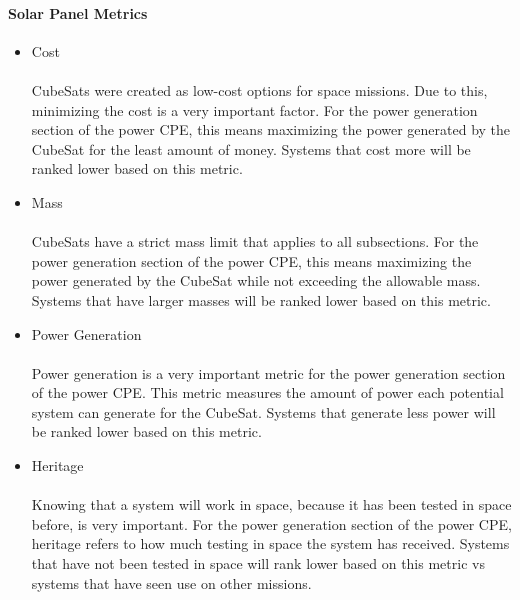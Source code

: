 \documentclass[3p]{elsarticle}
\begin{document}
\paragraph{Solar Panel Metrics}
\begin{itemize}
\item Cost\\
\\
CubeSats were created as low-cost options for space missions.  Due to this, minimizing the cost is a very important factor.  For the power generation section of the power CPE,  this means maximizing the power generated by the CubeSat for the least amount of money.  Systems that cost more will be ranked lower based on this metric.
\item{Mass} \\
\\
CubeSats have a strict mass limit that applies to all subsections.  For the power generation section of the power CPE, this means maximizing the power generated by the CubeSat while not exceeding the allowable mass.  Systems that have larger masses will be ranked lower based on this metric.
\item{Power Generation} \\
\\
Power generation is a very important metric for the power generation section of the power CPE.  This metric measures the amount of power each potential system can generate for the CubeSat.  Systems that generate less power will be ranked lower based on this metric.
\item{Heritage} \\
\\
Knowing that a system will work in space, because it has been tested in space before, is very important. For the power generation section of the power CPE, heritage refers to how much testing in space the system has received.  Systems that have not been tested in space will rank lower based on this metric vs systems that have seen use on other missions.
\end{itemize}
\end{document}
